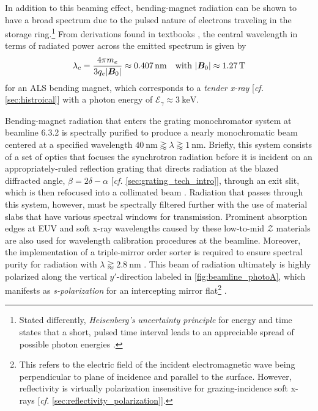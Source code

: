 In addition to this beaming effect, bending-magnet radiation can be shown to have a broad spectrum due to the pulsed nature of electrons traveling in the storage ring.\footnote{Stated differently, \emph{Heisenberg's uncertainty principle} for energy and time states that a short, pulsed time interval leads to an appreciable spread of possible photon energies \cite[\emph{cf.\@} \cref{sec:gen_first_order}]{Attwood17}.} 
From derivations found in textbooks \cite{Attwood17,Jackson75}, the central wavelength in terms of radiated power across the emitted spectrum is given by 
\begin{equation}
 \lambda_c = \frac{4 \pi m_e}{3 q_e \abs{\mathbold{B}_0}} \approx \SI{0.407}{\nm} \quad \text{with } \abs{\mathbold{B}_0} \approx \SI{1.27}{\tesla}
 \end{equation}
for an ALS bending magnet, which corresponds to a \emph{tender x-ray} [\emph{cf.\@} \cref{sec:histroical}] with a photon energy of $\mathcal{E}_{\gamma} \approx \SI{3}{\kilo\electronvolt}$. 

Bending-magnet radiation that enters the grating monochromator system at beamline 6.3.2 is spectrally purified to produce a nearly monochromatic beam centered at a specified wavelength $\SI{40}{\nm} \gtrapprox \lambda \gtrapprox \SI{1}{\nm}$. 
Briefly, this system consists of a set of optics that focuses the synchrotron radiation before it is incident on an appropriately-ruled reflection grating that directs radiation at the blazed diffracted angle, $\beta = 2 \delta - \alpha$ [\emph{cf.\@} \cref{sec:grating_tech_intro}], through an exit slit, which is then refocused into a collimated beam \cite{Underwood96}. 
Radiation that passes through this system, however, must be spectrally filtered further with the use of material slabs that have various spectral windows for transmission. 
Prominent absorption edges at EUV and soft x-ray wavelengths caused by these low-to-mid $\mathcal{Z}$ materials are also used for wavelength calibration procedures at the beamline. 
Moreover, the implementation of a triple-mirror order sorter is required to ensure spectral purity for radiation with $\lambda \gtrapprox \SI{2.8}{\nm}$ \cite{Gullikson01}. 
This beam of radiation ultimately is highly polarized along the vertical $y'$-direction labeled in \cref{fig:beamline_photoA}, which manifests as \emph{s-polarization} for an intercepting mirror flat\footnote{This refers to the electric field of the incident electromagnetic wave being perpendicular to plane of incidence and parallel to the surface. However, reflectivity is virtually polarization insensitive for grazing-incidence soft x-rays [\emph{cf.\@} \cref{sec:reflectivity_polarization}].} \cite{Muhlestein19}. 

